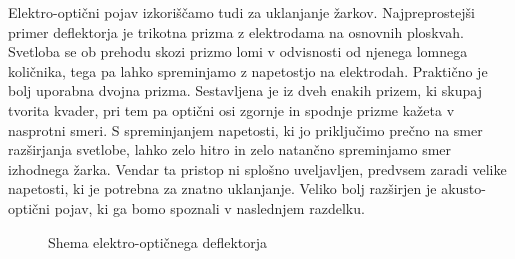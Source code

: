 \begin{remark}
Elektro-optični pojav izkoriščamo tudi za uklanjanje žarkov. 
Najpreprostejši primer deflektorja je trikotna prizma z elektrodama na osnovnih 
ploskvah. Svetloba se ob prehodu skozi prizmo lomi v odvisnosti od njenega 
lomnega količnika, tega pa lahko spreminjamo 
z napetostjo na elektrodah. Praktično je bolj uporabna dvojna prizma. Sestavljena je iz dveh enakih 
prizem, ki skupaj tvorita kvader, pri tem pa optični osi zgornje in spodnje prizme
kažeta v nasprotni smeri. S spreminjanjem napetosti, ki jo priključimo prečno na smer
razširjanja svetlobe, lahko zelo hitro in zelo natančno spreminjamo smer izhodnega žarka. 
Vendar ta pristop ni splošno uveljavljen, predvsem zaradi velike napetosti, ki je 
potrebna za znatno uklanjanje. Veliko bolj razširjen je akusto-optični pojav, ki ga 
bomo spoznali v naslednjem razdelku. 
\begin{figure}[h]
\centering
\def\svgwidth{95truemm} 

\caption{Shema elektro-optičnega deflektorja}
\label{fig:deflshema}
\end{figure}
\end{remark}


